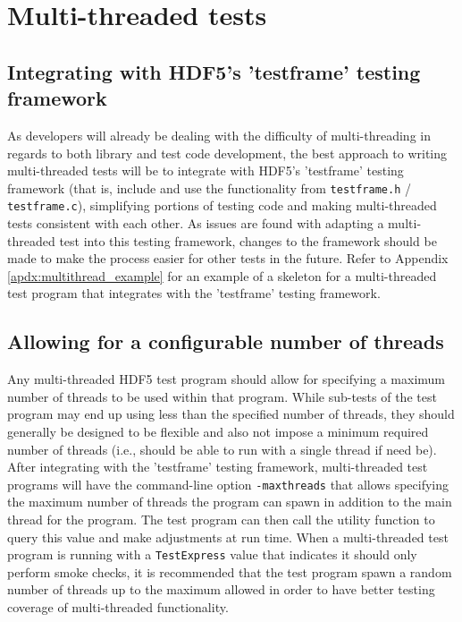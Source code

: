 \documentclass[../HDF5_RFC.tex]{subfiles}
\begin{document}
\section{Multi-threaded tests}
\label{multithread}

\subsection{Integrating with HDF5's 'testframe' testing framework}

As developers will already be dealing with the difficulty of multi-threading in regards to both library
and test code development, the best approach to writing multi-threaded tests will be to integrate with
HDF5's 'testframe' testing framework (that is, include and use the functionality from \texttt{testframe.h} / \texttt{testframe.c}), simplifying portions of testing code and making multi-threaded tests consistent
with each other. As issues are found with adapting a multi-threaded test into this testing framework,
changes to the framework should be made to make the process easier for other tests in the future. Refer
to Appendix \ref{apdx:multithread_example} for an example of a skeleton for a multi-threaded test program
that integrates with the 'testframe' testing framework.

\subsection{Allowing for a configurable number of threads}

Any multi-threaded HDF5 test program should allow for specifying a maximum number of threads to be
used within that program. While sub-tests of the test program may end up using less than the specified
number of threads, they should generally be designed to be flexible and also not impose a minimum
required number of threads (i.e., should be able to run with a single thread if need be). After integrating
with the 'testframe' testing framework, multi-threaded test programs will have the command-line option
\texttt{-maxthreads} that allows specifying the maximum number of threads the program can spawn in addition
to the main thread for the program. The test program can then call the  utility function to query this value and make adjustments at
run time. When a multi-threaded test program is running with a \texttt{TestExpress} value that indicates it should only perform smoke checks, it is recommended that the test program spawn a random number of threads
up to the maximum allowed in order to have better testing coverage of multi-threaded functionality.
\end{document}
